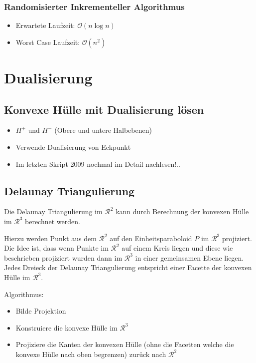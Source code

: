 \documentclass[a4paper]{article}
\begin{document}
\subsubsection*{Randomisierter Inkrementeller Algorithmus}
\begin{itemize}
	\item Erwartete Laufzeit: $\mathcal{O}(n \log n)$
	\item Worst Case Laufzeit: $\mathcal{O}(n^2)$
\end{itemize}

\section*{Dualisierung}
\subsection*{Konvexe Hülle mit Dualisierung lösen}
\begin{itemize}
	\item $H^+$ und $H^-$ (Obere und untere Halbebenen)
	\item Verwende Dualisierung von Eckpunkt 
	\item Im letzten Skript 2009 nochmal im Detail nachlesen!..
\end{itemize}

\subsection*{Delaunay Triangulierung}
Die Delaunay Triangulierung im $\mathcal{R}^2$ kann durch Berechnung der konvexen Hülle
im $\mathcal{R}^3$ berechnet werden.

Hierzu werden Punkt aus dem $\mathcal{R}^2$ auf den Einheitsparaboloid $P$ im $\mathcal{R}^3$ 
projiziert. Die Idee ist, dass wenn Punkte im $\mathcal{R}^2$ auf einem Kreis liegen und diese
wie beschrieben projiziert wurden dann im $\mathcal{R}^3$ in einer gemeinsamen Ebene liegen.
Jedes Dreieck der Delaunay Triangulierung entspricht einer Facette der konvexen Hülle im $\mathcal{R}^3$.

Algorithmus:

\begin{itemize}
	\item Bilde Projektion
	\item Konstruiere die konvexe Hülle im $\mathcal{R}^3$
	\item Projiziere die Kanten der konvexen Hülle  (ohne die Facetten welche die konvexe Hülle
	nach oben begrenzen) zurück nach $\mathcal{R}^2$
\end{itemize}
\end{document}
